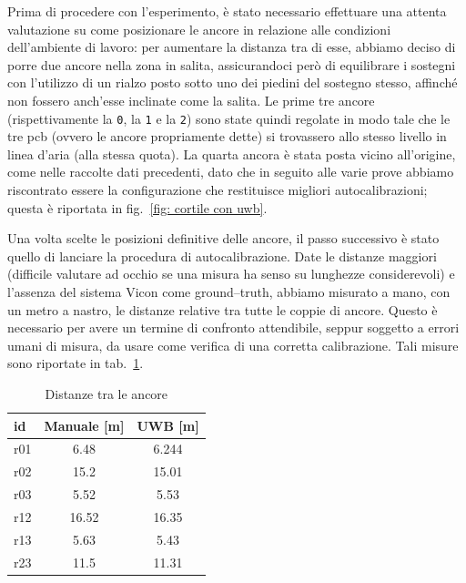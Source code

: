 \vspace{0.5cm}
Prima di procedere con l'esperimento, è stato necessario effettuare una attenta valutazione su come posizionare le ancore in relazione alle condizioni dell'ambiente di lavoro: per aumentare la distanza tra di esse, abbiamo deciso di porre due ancore nella zona in salita, assicurandoci però di equilibrare i sostegni con l'utilizzo di un rialzo posto sotto uno dei piedini del sostegno stesso, affinché non fossero anch'esse inclinate come la salita. 
Le prime tre ancore (rispettivamente la \verb|0|, la \verb|1| e la \verb|2|) sono state quindi regolate in modo tale che le tre pcb (ovvero le ancore propriamente dette) si trovassero allo stesso livello in linea d'aria (alla stessa quota). 
La quarta ancora è stata posta vicino all'origine, come nelle raccolte dati precedenti, dato che in seguito alle varie prove abbiamo riscontrato essere la configurazione che restituisce migliori autocalibrazioni; questa è riportata in fig.~\ref{fig: cortile con uwb}. 

Una volta scelte le posizioni definitive delle ancore, il passo successivo è stato quello di lanciare la procedura di autocalibrazione. 
Date le distanze maggiori (difficile valutare ad occhio se una misura ha senso su lunghezze considerevoli) e l'assenza del sistema Vicon come ground--truth, abbiamo misurato a mano, con un metro a nastro, le distanze relative tra tutte le coppie di ancore. 
Questo è necessario per avere un termine di confronto attendibile, seppur soggetto a errori umani di misura, da usare come verifica di una corretta calibrazione. 
Tali misure sono riportate in tab.~\ref{tab: Distanze tra le ancore}.

\begin{table}[h]
\centering
\begin{tabular}{|l|c|c|}
\hline
id  & Manuale [m] & UWB [m] \\ \hline
r01 & 6.48  & 6.244       \\ \hline
r02 & 15.2  & 15.01       \\ \hline
r03 & 5.52  & 5.53        \\ \hline
r12 & 16.52 & 16.35       \\ \hline
r13 & 5.63  & 5.43        \\ \hline
r23 & 11.5  & 11.31       \\ \hline
\end{tabular}
\caption{Distanze tra le ancore}
\label{tab: Distanze tra le ancore}
\end{table}


